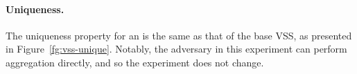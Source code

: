 \paragraph{Uniqueness.}
The uniqueness property for an \AVSS is the same as that of the base VSS, as presented in Figure~\ref{fg:vss-unique}.
Notably, the adversary in this experiment can perform aggregation directly,
and so the experiment does not change.

